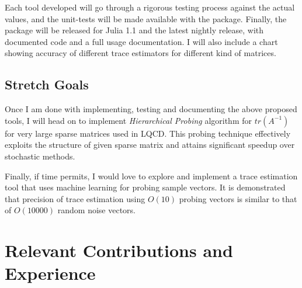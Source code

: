 \documentclass[12]{article}
\begin{document}
Each tool developed will go through a rigorous testing process against the actual values, and the unit-tests will be made available with the package. Finally, the package will be released for Julia 1.1 and the latest nightly release, with  documented code and a full usage documentation. I will also include a chart showing accuracy of different trace estimators for different kind of matrices.    
\subsection{Stretch Goals}
Once I am done with implementing, testing and documenting the above proposed tools, I will head on to implement \textit{Hierarchical Probing} algorithm\cite{stathopoulos2013hierarchical} for $tr(A^{-1})$ for very large sparse matrices used in LQCD. This probing technique effectively exploits the structure of given sparse matrix and attains significant speedup over stochastic methods.

Finally, if time permits, I would love to explore and implement a trace estimation tool that uses machine learning for probing sample vectors. It is demonstrated that precision of trace estimation using $O(10)$ probing vectors is similar to that of $O(10000)$ random noise vectors\cite{yoon2016estimation}.

\section{Relevant Contributions and Experience}
\end{document}
